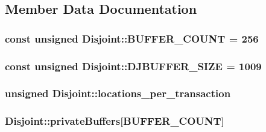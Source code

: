 \subsection{Member Data Documentation}
\hypertarget{structDisjoint_acfc6dad8c41eb41ba711f907b6be98d3}{
\subsubsection[{B\-U\-F\-F\-E\-R\-\_\-\-C\-O\-U\-N\-T}]{\setlength{\rightskip}{0pt plus 5cm}const unsigned Disjoint\-::\-B\-U\-F\-F\-E\-R\-\_\-\-C\-O\-U\-N\-T = 256\hspace{0.3cm}{\ttfamily [static]}}}\label{structDisjoint_acfc6dad8c41eb41ba711f907b6be98d3}
\hypertarget{structDisjoint_a3514072cfe176cf5953ee3a7444a3c7c}{
\subsubsection[{D\-J\-B\-U\-F\-F\-E\-R\-\_\-\-S\-I\-Z\-E}]{\setlength{\rightskip}{0pt plus 5cm}const unsigned Disjoint\-::\-D\-J\-B\-U\-F\-F\-E\-R\-\_\-\-S\-I\-Z\-E = 1009\hspace{0.3cm}{\ttfamily [static]}}}\label{structDisjoint_a3514072cfe176cf5953ee3a7444a3c7c}
\hypertarget{structDisjoint_aa144f54b8724bb1e00b1715ebce8d7f2}{
\subsubsection[{locations\-\_\-per\-\_\-transaction}]{\setlength{\rightskip}{0pt plus 5cm}unsigned Disjoint\-::locations\-\_\-per\-\_\-transaction}}\label{structDisjoint_aa144f54b8724bb1e00b1715ebce8d7f2}
\hypertarget{structDisjoint_ac7ea93b748d1fbfd37086d5060df651b}{
\subsubsection[{private\-Buffers}]{ Disjoint\-::private\-Buffers\mbox{[}{\bf B\-U\-F\-F\-E\-R\-\_\-\-C\-O\-U\-N\-T}\mbox{]}}}\label{structDisjoint_ac7ea93b748d1fbfd37086d5060df651b}
